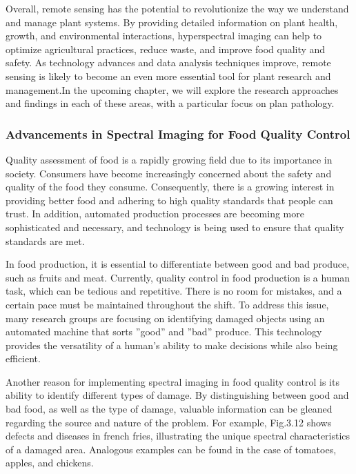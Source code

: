 \documentclass{article}
\begin{document}
{            Overall, remote sensing has the potential to revolutionize the way we understand and manage plant systems. By providing detailed information on plant health, growth, and environmental interactions, hyperspectral imaging can help to optimize agricultural practices, reduce waste, and improve food quality and safety. As technology advances and data analysis techniques improve, remote sensing is likely to become an even more essential tool for plant research and management.In the upcoming chapter, we will explore the research approaches and findings in each of these areas, with a particular focus on plan pathology.\cite{Thenkabail}
                \subsubsection{Advancements in Spectral Imaging for Food Quality Control}
                \hspace{0.5cm}Quality assessment of food is a rapidly growing field due to its importance in society. Consumers have become increasingly concerned about the safety and quality of the food they consume. Consequently, there is a growing interest in providing better food and adhering to high quality standards that people can trust. In addition, automated production processes are becoming more sophisticated and necessary, and technology is being used to ensure that quality standards are met.\par
                In food production, it is essential to differentiate between good and bad produce, such as fruits and meat. Currently, quality control in food production is a human task, which can be tedious and repetitive. There is no room for mistakes, and a certain pace must be maintained throughout the shift. To address this issue, many research groups are focusing on identifying damaged objects using an automated machine that sorts ”good” and ”bad” produce. This technology provides the versatility of a human’s ability to make decisions while also being efficient.\par
                Another reason for implementing spectral imaging in food quality control is its ability to identify different types of damage. By distinguishing between good and bad food, as well as the type of damage, valuable information can be gleaned regarding the source and nature of the problem. For example, Fig.3.12 shows defects and diseases in french fries, illustrating the unique spectral characteristics of a damaged area. Analogous examples can be found in the case of tomatoes, apples, and chickens.\par
                \vspace*{3\baselineskip}
                
}
\end{document}
